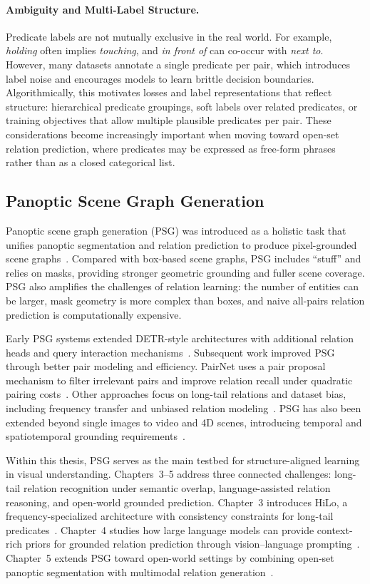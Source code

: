 \paragraph{Ambiguity and Multi-Label Structure.}
Predicate labels are not mutually exclusive in the real world. For example, \emph{holding} often implies \emph{touching}, and \emph{in front of} can co-occur with \emph{next to}. However, many datasets annotate a single predicate per pair, which introduces label noise and encourages models to learn brittle decision boundaries. Algorithmically, this motivates losses and label representations that reflect structure: hierarchical predicate groupings, soft labels over related predicates, or training objectives that allow multiple plausible predicates per pair. These considerations become increasingly important when moving toward open-set relation prediction, where predicates may be expressed as free-form phrases rather than as a closed categorical list.

\subsection{Panoptic Scene Graph Generation}
Panoptic scene graph generation (PSG) was introduced as a holistic task that unifies panoptic segmentation and relation prediction to produce pixel-grounded scene graphs~\citep{yang2022panoptic}. Compared with box-based scene graphs, PSG includes ``stuff'' and relies on masks, providing stronger geometric grounding and fuller scene coverage. PSG also amplifies the challenges of relation learning: the number of entities can be larger, mask geometry is more complex than boxes, and naive all-pairs relation prediction is computationally expensive.

Early PSG systems extended DETR-style architectures with additional relation heads and query interaction mechanisms~\citep{yang2022panoptic}. Subsequent work improved PSG through better pair modeling and efficiency. PairNet uses a pair proposal mechanism to filter irrelevant pairs and improve relation recall under quadratic pairing costs~\citep{wang2023pair}. Other approaches focus on long-tail relations and dataset bias, including frequency transfer and unbiased relation modeling~\citep{zhou2023hilo, li2023panoptic, hayder2024dsgg, lorenz2024fair}. PSG has also been extended beyond single images to video and 4D scenes, introducing temporal and spatiotemporal grounding requirements~\citep{yang2023panoptic, yang20234d}.

Within this thesis, PSG serves as the main testbed for structure-aligned learning in visual understanding. Chapters~3--5 address three connected challenges: long-tail relation recognition under semantic overlap, language-assisted relation reasoning, and open-world grounded prediction. Chapter~3 introduces HiLo, a frequency-specialized architecture with consistency constraints for long-tail predicates~\citep{zhou2023hilo}. Chapter~4 studies how large language models can provide context-rich priors for grounded relation prediction through vision--language prompting~\citep{zhou2025vlprompt}. Chapter~5 extends PSG toward open-world settings by combining open-set panoptic segmentation with multimodal relation generation~\citep{zhou2025openpsg}.

